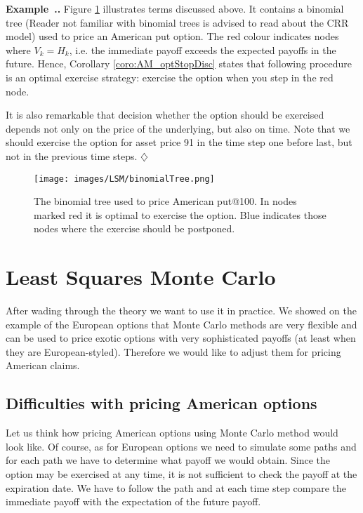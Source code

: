 \documentclass[a4paper,11pt, twoside]{book}
\theoremstyle{definition}
\theoremstyle{remark}
\newcounter{example}[chapter]
\newenvironment{example}
   {\refstepcounter{example} \par\medskip\noindent \textbf{Example~\arabic{chapter}.\arabic{example}.}  }
   {\hfill $\diamondsuit$\par\noindent\ignorespacesafterend}
\begin{document}
\begin{example}
 Figure \ref{fig:binTree} illustrates terms discussed above. It contains a binomial tree (Reader not familiar with binomial trees is advised to read about the CRR model) used to price an American put option. The red colour indicates nodes where $V_{k} = H_{k}$, i.e. the immediate payoff exceeds the expected payoffs in the future. Hence, Corollary \ref{coro:AM_optStopDisc} states that following procedure is an optimal exercise strategy: exercise the option when you step in the red node.
 
 It is also remarkable that decision whether the option should be exercised depends not only on the price of the underlying, but also on time. Note that we should exercise the option for asset price 91 in the time step one before last, but not in the previous time steps.
\end{example}

\begin{figure}[!ht]
\centering
 \texttt{[image: images/LSM/binomialTree.png]}
\caption{The binomial tree used to price American put@100. In nodes marked red it is optimal to exercise the option. Blue indicates those nodes where the exercise should be postponed. }
\label{fig:binTree}
\end{figure}

\section{Least Squares Monte Carlo}
After wading through the theory we want to use it in practice. We showed on the example of the European options that Monte Carlo methods are very flexible and can be used to price exotic options with very sophisticated payoffs (at least when they are European-styled). Therefore we would like to adjust them for pricing American claims. 

\subsection{Difficulties with pricing American options}

Let us think how pricing American options using Monte Carlo method would look like. Of course, as for European options we need to simulate some paths and for each path we have to determine what payoff we would obtain. Since the option may be exercised at any time, it is not sufficient to check the payoff at the expiration date. We have to follow the path and at each time step compare the immediate payoff with the expectation of the future payoff.
\end{document}
